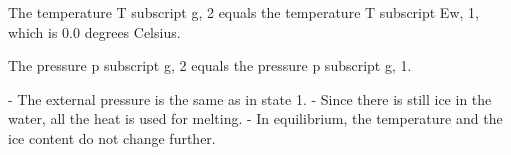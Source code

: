 The temperature T subscript g, 2 equals the temperature T subscript Ew, 1, which is 0.0 degrees Celsius.

The pressure p subscript g, 2 equals the pressure p subscript g, 1.

- The external pressure is the same as in state 1.
- Since there is still ice in the water, all the heat is used for melting.
- In equilibrium, the temperature and the ice content do not change further.
